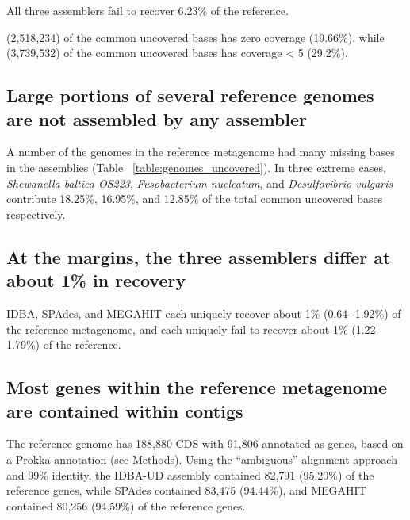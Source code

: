 \documentclass[10pt,a4paper,twocolumn]{article}
\begin{document}

All three assemblers fail to recover 6.23\% of the reference.

(2,518,234) of the common uncovered bases has zero coverage (19.66\%),
while (3,739,532) of the common uncovered bases has coverage \textless
5 (29.2\%).

\subsection*{Large portions of several reference genomes are not assembled by any assembler}

A number of the genomes in the reference metagenome had many missing
bases in the assemblies (Table ~\ref{table:genomes_uncovered}). In
three extreme cases, {\em Shewanella baltica OS223}, {\em Fusobacterium
nucleatum}, and {\em Desulfovibrio vulgaris} contribute 18.25\%, 16.95\%, and 12.85\%
of the total common uncovered bases respectively.



\subsection*{At the margins, the three assemblers differ at about 1\% in recovery}
IDBA, SPAdes, and MEGAHIT each uniquely recover about 1\% (0.64
-1.92\%) of the reference metagenome, and each uniquely fail to
recover about 1\% (1.22-1.79\%) of the reference.

\subsection*{Most genes within the reference metagenome are contained within contigs}

The reference genome has 188,880 CDS with 91,806 annotated as genes,
based on a Prokka annotation (see Methods).
Using the ``ambiguous'' alignment approach and 99\% identity, the
IDBA-UD assembly contained 82,791 (95.20\%) of the reference genes,
while SPAdes contained 83,475 (94.44\%), and
MEGAHIT contained 80,256 (94.59\%) of the reference genes.
\end{document}

